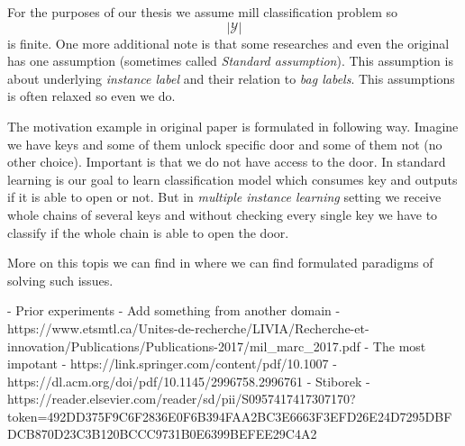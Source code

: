 For the purposes of our thesis we assume mill classification problem so $$|\mathcal{Y}|$$ is finite. One more additional note is that some researches and even the original has one assumption (sometimes called \emph{Standard assumption}). This assumption is about underlying \emph{instance label} and their relation to \emph{bag labels}. This assumptions is often relaxed \cite{Xu2003} so even we do.




The motivation example in original paper \cite{Dietterich1997} is formulated in following way. Imagine we have keys and some of them unlock specific door and some of them not (no other choice). Important is that we do not have access to the door. In standard learning is our goal to learn classification model which consumes key and outputs if it is able to open or not. But in \emph{multiple instance learning} setting we receive whole chains of several keys and without checking every single key we have to classify if the whole chain is able to open the door.

More on this topis we can find in \cite{Amores2013} where we can find formulated paradigms of solving such issues.




- Prior experiments
    - Add something from another domain
    - https://www.etsmtl.ca/Unites-de-recherche/LIVIA/Recherche-et-innovation/Publications/Publications-2017/mil_marc_2017.pdf
    - The most impotant
        - https://link.springer.com/content/pdf/10.1007%
        - https://dl.acm.org/doi/pdf/10.1145/2996758.2996761
        - Stiborek - https://reader.elsevier.com/reader/sd/pii/S0957417417307170?token=492DD375F9C6F2836E0F6B394FAA2BC3E6663F3EFD26E24D7295DBFDCB870D23C3B120BCCC9731B0E6399BEFEE29C4A2

